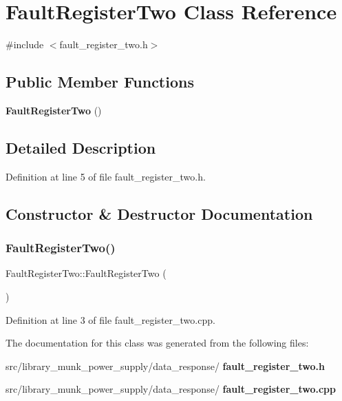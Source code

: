 \section{Fault\+Register\+Two Class Reference}
\label{class_fault_register_two}


{\ttfamily \#include $<$fault\+\_\+register\+\_\+two.\+h$>$}

\subsection*{Public Member Functions}
\begin{DoxyCompactItemize}
\item 
\textbf{ Fault\+Register\+Two} ()
\end{DoxyCompactItemize}


\subsection{Detailed Description}


Definition at line 5 of file fault\+\_\+register\+\_\+two.\+h.



\subsection{Constructor \& Destructor Documentation}
\mbox{\label{class_fault_register_two_a0af9cc7c92a39c89034e74bd480e06bb}} 
\subsubsection{Fault\+Register\+Two()}
{\footnotesize\ttfamily Fault\+Register\+Two\+::\+Fault\+Register\+Two (\begin{DoxyParamCaption}{ }\end{DoxyParamCaption})}



Definition at line 3 of file fault\+\_\+register\+\_\+two.\+cpp.



The documentation for this class was generated from the following files\+:\begin{DoxyCompactItemize}
\item 
src/library\+\_\+munk\+\_\+power\+\_\+supply/data\+\_\+response/\textbf{ fault\+\_\+register\+\_\+two.\+h}\item 
src/library\+\_\+munk\+\_\+power\+\_\+supply/data\+\_\+response/\textbf{ fault\+\_\+register\+\_\+two.\+cpp}\end{DoxyCompactItemize}
